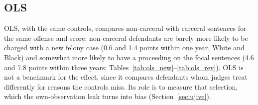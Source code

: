 \documentclass[11pt]{article}
\begin{document}
\subsection{OLS}\label{sec:ols}

OLS, with the same controls, compares non-carceral with carceral sentences for the same offense and score: non-carceral defendants are barely more likely to be charged with a new felony case (0.6 and 1.4 points within one year, White and Black) and somewhat more likely to have a proceeding on the focal sentences (4.6 and 7.8 points within three years; Tables~\ref{tab:ols_new}--\ref{tab:ols_rev}). OLS is not a benchmark for the effect, since it compares defendants whom judges treat differently for reasons the controls miss. Its role is to measure that selection, which the own-observation leak turns into bias (Section~\ref{sec:ujive}).
\end{document}
